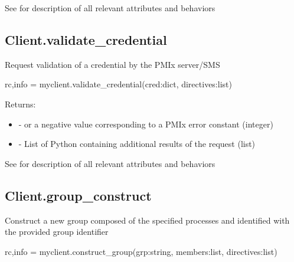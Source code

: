 See  for description of all relevant attributes and behaviors


\subsection{Client.validate_credential}

\summary

Request validation of a credential by the PMIx server/SMS

\format

\pyspecificstart
\begin{codepar}
rc,info = myclient.validate_credential(cred:dict, directives:list)
\end{codepar}
\pyspecificend

\begin{arglist}
\end{arglist}

Returns:

\begin{itemize}
    \item {} -  or a negative value corresponding to a PMIx error constant (integer)
    \item {} - List of Python  containing additional results of the request (list)
\end{itemize}


See  for description of all relevant attributes and behaviors


\subsection{Client.group_construct}

\summary

Construct a new group composed of the specified processes and identified with
the provided group identifier

\format

\pyspecificstart
\begin{codepar}
rc,info = myclient.construct_group(grp:string, members:list, directives:list)
\end{codepar}
\pyspecificend

